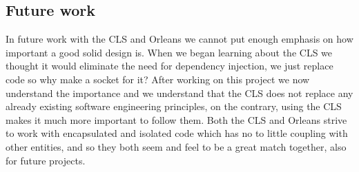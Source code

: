 




\subsection{Future work}
In future work with the CLS and Orleans we cannot put enough emphasis on how important a good solid design is. When we began learning about the CLS we thought it would eliminate the need for dependency injection, we just replace code so why make a socket for it? After working on this project we now understand the importance and we understand that the CLS does not replace any already existing software engineering principles, on the contrary, using the CLS makes it much more important to follow them. Both the CLS and Orleans strive to work with encapsulated and isolated code which has no to little coupling with other entities, and so they both seem and feel to be a great match together, also for future projects.